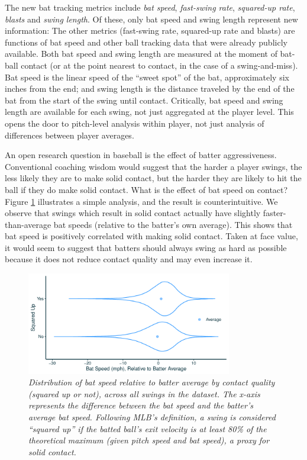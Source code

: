 \documentclass{article}
\begin{document}
    The new bat tracking metrics include {\it bat speed}, {\it fast-swing rate}, {\it squared-up rate}, {\it blasts} and {\it swing length}. Of these, only bat speed and swing length represent new information: The other metrics (fast-swing rate, squared-up rate and blasts) are functions of bat speed and other ball tracking data that were already publicly available. Both bat speed and swing length are measured at the moment of bat-ball contact (or at the point nearest to contact, in the case of a swing-and-miss). Bat speed is the linear speed of the ``sweet spot'' of the bat, approximately six inches from the end; and swing length is the distance traveled by the end of the bat from the start of the swing until contact. Critically, bat speed and swing length are available for each swing, not just aggregated at the player level. This opens the door to pitch-level analysis within player, not just analysis of differences between player averages.

    An open research question in baseball is the effect of batter aggressiveness. Conventional coaching wisdom would suggest that the harder a player swings, the less likely they are to make solid contact, but the harder they are likely to hit the ball if they do make solid contact. What is the effect of bat speed on contact? Figure \ref{fig:counterintuitive} illustrates a simple analysis, and the result is counterintuitive. We observe that swings which result in solid contact actually have slightly faster-than-average bat speeds (relative to the batter's own average). This shows that bat speed is positively correlated with making solid contact. Taken at face value, it would seem to suggest that batters should always swing as hard as possible because it does not reduce contact quality and may even increase it.

    \begin{figure}[H]
      \centering
      \includegraphics[width = 0.8\textwidth]{../../figures/counterintuitive.pdf}
      \caption{\it Distribution of bat speed relative to batter average by contact quality (squared up or not), across all swings in the dataset. The x-axis represents the difference between the bat speed and the batter's average bat speed. Following MLB's definition, a swing is considered ``squared up'' if the batted ball's exit velocity is at least 80\% of the theoretical maximum (given pitch speed and bat speed), a proxy for solid contact.}
      \label{fig:counterintuitive}
    \end{figure}
\end{document}
